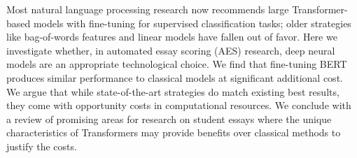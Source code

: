 Most natural language processing research now recommends large Transformer-based models with fine-tuning for supervised classification tasks; older strategies like bag-of-words features and linear models have fallen out of favor. Here we investigate whether, in automated essay scoring (AES) research, deep neural models are an appropriate technological choice. We find that fine-tuning BERT produces similar performance to classical models at significant additional cost. We argue that while state-of-the-art strategies do match existing best results, they come with opportunity costs in computational resources. We conclude with a review of promising areas for research on student essays where the unique characteristics of Transformers may provide benefits over classical methods to justify the costs.

